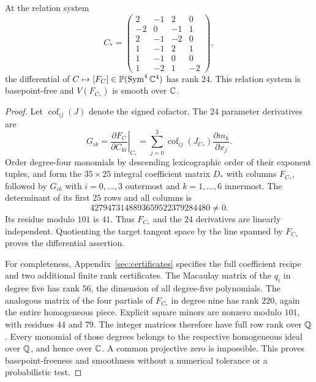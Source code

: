 \begin{lemma}\label{lem:differential}
At the relation system
\begin{equation}\label{eq:C-star}
 C_*=
 \begin{pmatrix}
 2&-1&2&0\\-2&0&-1&1\\2&-1&-2&0\\
 1&-1&2&1\\1&-1&0&0\\1&-2&1&-2
 \end{pmatrix},
\end{equation}
the differential of $C\mapsto[F_C]\in\mathbb P(\operatorname{Sym}^4\mathbb C^4)$ has
rank $24$. This relation system is basepoint-free and $V(F_{C_*})$
is smooth over $\mathbb C$.
\end{lemma}
\begin{proof}
Let $\operatorname{cof}_{ij}(J)$ denote the signed cofactor. The
$24$ parameter derivatives are
\begin{equation}\label{eq:jacobian-derivatives}
 G_{ik}=\left.\frac{\partial F_C}{\partial C_{ki}}\right|_{C_*}
       =\sum_{j=0}^3\operatorname{cof}_{ij}(J_{C_*})
                                    \frac{\partial m_k}{\partial x_j}.
\end{equation}
Order degree-four monomials by descending lexicographic order of their
exponent tuples, and form the $35\times25$ integral coefficient matrix
$D_*$ with columns $F_{C_*}$, followed by $G_{ik}$ with $i=0,\ldots,3$
outermost and $k=1,\ldots,6$ innermost. The determinant of its first
$25$ rows and all columns is
\begin{equation}\label{eq:exact-differential-det}
 4279473148893659522379284480\ne0.
\end{equation}
Its residue modulo $101$ is $41$. Thus $F_{C_*}$ and the $24$
derivatives are linearly independent. Quotienting the target tangent
space by the line spanned by $F_{C_*}$ proves the differential assertion.

For completeness, Appendix~\ref{sec:certificates} specifies the full
coefficient recipe and two additional finite rank certificates. The
Macaulay matrix of the $q_i$ in degree five has rank $56$, the dimension
of all degree-five polynomials. The analogous matrix of the four
partials of $F_{C_*}$ in degree nine has rank $220$, again the entire
homogeneous piece. Explicit square minors are nonzero modulo $101$,
with residues $44$ and $79$. The integer matrices therefore have full
row rank over $\mathbb Q$. Every monomial of those degrees belongs to the
respective homogeneous ideal over $\mathbb Q$, and hence over $\mathbb C$.
A common projective zero is impossible. This proves basepoint-freeness
and smoothness without a numerical tolerance or a probabilistic test.
\end{proof}


